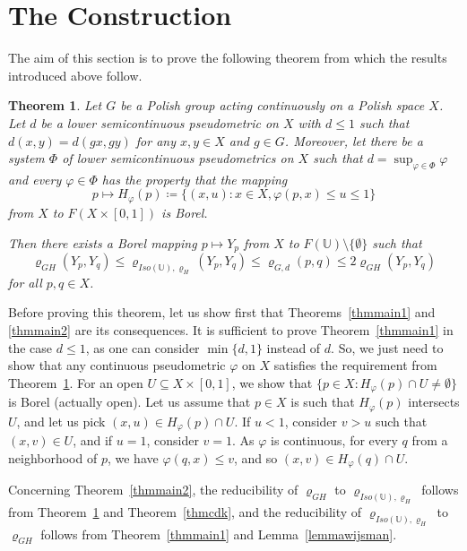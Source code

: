 \documentclass[a4paper]{amsart}
\theoremstyle{plain}
\newtheorem{theorem}{Theorem}[section]
\theoremstyle{remark}
\begin{document}
\section{The Construction}


The aim of this section is to prove the following theorem from which the results introduced above follow.


\begin{theorem} \label{thmmain3}
Let $ G $ be a Polish group acting continuously on a Polish space $ X $. Let $ d $ be a lower semicontinuous pseudometric on $ X $ with $ d \leq 1 $ such that $ d(x, y) = d(gx, gy) $ for any $ x, y \in X $ and $ g \in G $. Moreover, let there be a system $ \Phi $ of lower semicontinuous pseudometrics on $ X $ such that $ d = \sup_{\varphi \in \Phi} \varphi $ and every $ \varphi \in \Phi $ has the property that the mapping
$$ p \mapsto H_{\varphi}(p) \coloneqq \big\{ (x, u) : x \in X, \varphi(p, x) \leq u \leq 1 \big\} $$
from $ X $ to $ F(X \times [0, 1]) $ is Borel.

Then there exists a Borel mapping $ p \mapsto Y_{p} $ from $ X $ to $ F(\mathbb{U}) \setminus \{ \emptyset \} $ such that
$$ \varrho_{GH}(Y_{p}, Y_{q}) \leq \varrho_{Iso(\mathbb{U}), \varrho_{H}}(Y_{p}, Y_{q}) \leq \varrho_{G, d}(p, q) \leq 2 \varrho_{GH}(Y_{p}, Y_{q}) $$
for all $ p, q \in X $.
\end{theorem}


Before proving this theorem, let us show first that Theorems~\ref{thmmain1} and \ref{thmmain2} are its consequences. It is sufficient to prove Theorem~\ref{thmmain1} in the case $ d \leq 1 $, as one can consider $ \min \{ d, 1 \} $ instead of $ d $. So, we just need to show that any continuous pseudometric $ \varphi $ on $ X $ satisfies the requirement from Theorem~\ref{thmmain3}. For an open $ U \subseteq X \times [0, 1] $, we show that $ \{ p \in X : H_{\varphi}(p) \cap U \neq \emptyset \} $ is Borel (actually open). Let us assume that $ p \in X $ is such that $ H_{\varphi}(p) $ intersects $ U $, and let us pick $ (x, u) \in H_{\varphi}(p) \cap U $. If $ u < 1 $, consider $ v > u $ such that $ (x, v) \in U $, and if $ u = 1 $, consider $ v = 1 $. As $ \varphi $ is continuous, for every $ q $ from a neighborhood of $ p $, we have $ \varphi(q, x) \leq v $, and so $ (x, v) \in H_{\varphi}(q) \cap U $.

Concerning Theorem~\ref{thmmain2}, the reducibility of $ \varrho_{GH} $ to $ \varrho_{Iso(\mathbb{U}), \varrho_{H}} $ follows from Theorem~\ref{thmmain3} and Theorem~\ref{thmcdk}, and the reducibility of $ \varrho_{Iso(\mathbb{U}), \varrho_{H}} $ to $ \varrho_{GH} $ follows from Theorem~\ref{thmmain1} and Lemma~\ref{lemmawijsman}.
\end{document}
